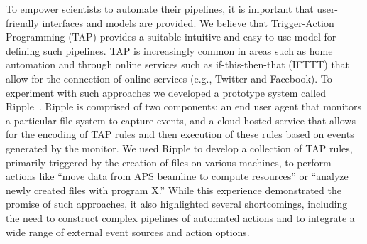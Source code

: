 \documentclass{aip-cp}
\begin{document}
To empower scientists to automate their pipelines, it is important that
user-friendly interfaces and models are provided. We believe that 
Trigger-Action Programming (TAP) provides a suitable intuitive and 
easy to use model for defining such pipelines. TAP is increasingly
common in areas such as home automation and through online services
such as if-this-then-that (IFTTT) that allow for the connection
of online services (e.g., Twitter and Facebook). To experiment
with such approaches we developed a prototype system called 
Ripple~\cite{chard17ripple}. Ripple is comprised of two components: an 
end user agent that monitors a particular file system to capture events, 
and a cloud-hosted service that allows for the encoding of TAP rules
and then execution of these rules based on events generated by the monitor.
We used Ripple to develop a collection of TAP rules, primarily
triggered by the creation of files on various 
machines, to perform actions like ``move data from APS beamline to
compute resources'' or ``analyze newly created files with program X.'' 
While this experience demonstrated the promise of such approaches, 
it also highlighted several shortcomings, including the need 
to construct complex pipelines of automated actions and to integrate
a wide range of external event sources and action options.
 

\end{document}
